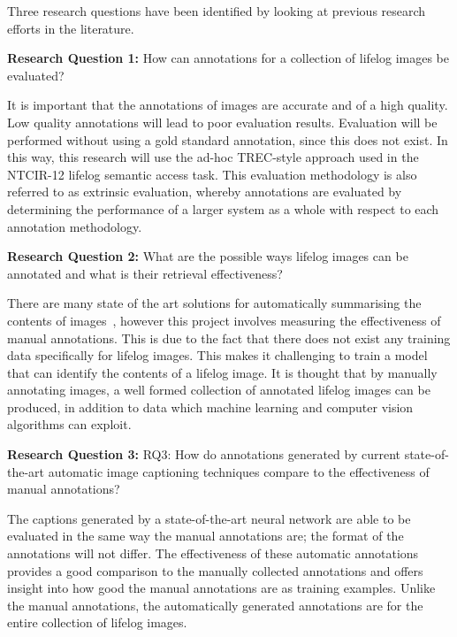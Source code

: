 Three research questions have been identified by looking at previous research efforts in the literature. 

\textbf{Research Question 1:} How can annotations for a collection of lifelog images be evaluated?

It is important that the annotations of images are accurate and of a high quality. Low quality annotations will lead to poor evaluation results. Evaluation will be performed without using a gold standard annotation, since this does not exist. In this way, this research will use the ad-hoc TREC-style approach used in the NTCIR-12 lifelog semantic access task. This evaluation methodology is also referred to as extrinsic evaluation, whereby annotations are evaluated by determining the performance of a larger system as a whole with respect to each annotation methodology.

\textbf{Research Question 2:} What are the possible ways lifelog images can be annotated and what is their retrieval effectiveness?

There are many state of the art solutions for automatically summarising the contents of images~\cite{karpathy2015deep}\cite{jia2014caffe}\cite{pan2004gcap}, however this project involves measuring the effectiveness of manual annotations. This is due to the fact that there does not exist any training data specifically for lifelog images. This makes it challenging to train a model that can identify the contents of a lifelog image. It is thought that by manually annotating images, a well formed collection of annotated lifelog images can be produced, in addition to data which machine learning and computer vision algorithms can exploit.

\textbf{Research Question 3:} RQ3: How do annotations generated by current state-of-the-art automatic image captioning techniques compare to the effectiveness of manual annotations?

The captions generated by a state-of-the-art neural network are able to be evaluated in the same way the manual annotations are; the format of the annotations will not differ. The effectiveness of these automatic annotations provides a good comparison to the manually collected annotations and offers insight into how good the manual annotations are as training examples. Unlike the manual annotations, the automatically generated annotations are for the entire collection of lifelog images. 